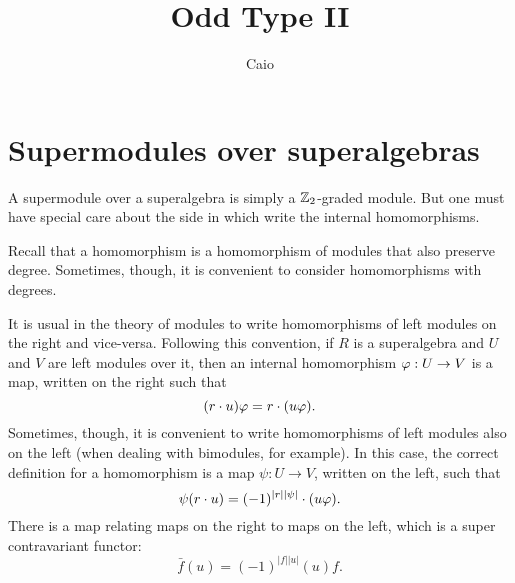 \documentclass{amsbook}
\begin{document}


\author[Caio]{Caio}
\address{Department of Mathematics and Statistics,
	Memorial University of Newfoundland,
St. John's, NL, A1C5S7, Canada}




\date{}

\title{Odd Type II}





\maketitle


\chapter{Supermodules over superalgebras}

A supermodule over a superalgebra is simply a $\mathbb{Z}_2$-graded module. But one must have special care about the side in which write the internal homomorphisms.

Recall that a homomorphism is a homomorphism of modules that also preserve degree. Sometimes, though, it is convenient to consider homomorphisms with degrees.

It is usual in the theory of modules to write homomorphisms of left modules on the right and vice-versa. Following this convention, if $R$ is a superalgebra and $U$ and $V$ are left modules over it, then an internal homomorphism $\varphi: U\to V$ is a map, written on the right such that
%
\begin{equation}\label{eq:map-on-the-right}
    (r\cdot u) \varphi = r\cdot (u \varphi).
\end{equation}
%
Sometimes, though, it is convenient to write homomorphisms of left modules also on the left (when dealing with bimodules, for example). In this case, the correct definition for a homomorphism is a map $\psi: U\to V$, written on the left, such that
%
\begin{equation}\label{eq:map-on-the-left}
    \psi (r\cdot u)  = (-1)^{|r||\psi|} \cdot (u \varphi).
\end{equation}
%
%
There is a map relating maps on the right to maps on the left, which is a super contravariant functor:
%
\begin{equation}\label{eq:map-change-side}
    \bar f (u)  = (-1)^{|f||u|} (u)f.
\end{equation}
%
\end{document}

